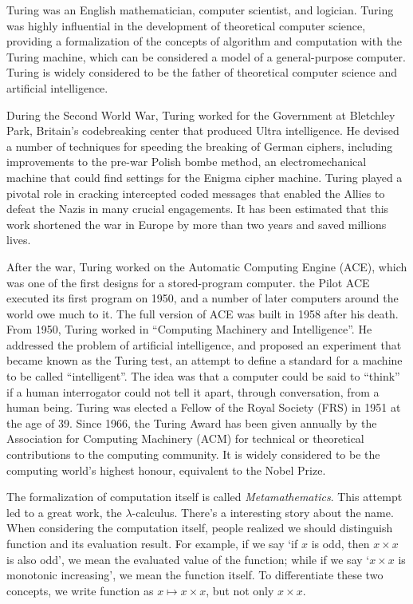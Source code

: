 \documentclass{article}
\begin{document}
Turing was an English mathematician, computer scientist, and logician. Turing was highly influential in the development of theoretical computer science, providing a formalization of the concepts of algorithm and computation with the Turing machine, which can be considered a model of a general-purpose computer. Turing is widely considered to be the father of theoretical computer science and artificial intelligence\cite{wiki-Turing}.

During the Second World War, Turing worked for the Government at Bletchley Park, Britain's codebreaking center that produced Ultra intelligence. He devised a number of techniques for speeding the breaking of German ciphers, including improvements to the pre-war Polish bombe method, an electromechanical machine that could find settings for the Enigma cipher machine. Turing played a pivotal role in cracking intercepted coded messages that enabled the Allies to defeat the Nazis in many crucial engagements. It has been estimated that this work shortened the war in Europe by more than two years and saved millions lives.

After the war, Turing worked on the Automatic Computing Engine (ACE), which was one of the first designs for a stored-program computer. the Pilot ACE  executed its first program on 1950, and a number of later computers around the world owe much to it. The full version of ACE was built in 1958 after his death. From 1950, Turing worked in ``Computing Machinery and Intelligence''. He addressed the problem of artificial intelligence, and proposed an experiment that became known as the Turing test, an attempt to define a standard for a machine to be called ``intelligent''. The idea was that a computer could be said to ``think'' if a human interrogator could not tell it apart, through conversation, from a human being. Turing was elected a Fellow of the Royal Society (FRS) in 1951 at the age of 39. Since 1966, the Turing Award has been given annually by the Association for Computing Machinery (ACM) for technical or theoretical contributions to the computing community. It is widely considered to be the computing world's highest honour, equivalent to the Nobel Prize.

The formalization of computation itself is called {\em Metamathematics}. This attempt led to a great work, the $\lambda$-calculus. There's a interesting story about the name. When considering the computation itself, people realized we should distinguish function and its evaluation result. For example, if we say `if $x$ is odd, then $x \times x$ is also odd', we mean the evaluated value of the function; while if we say `$x \times x$ is monotonic increasing', we mean the function itself. To differentiate these two concepts, we write function as $x \mapsto x \times x$, but not only $x \times x$.
\end{document}

